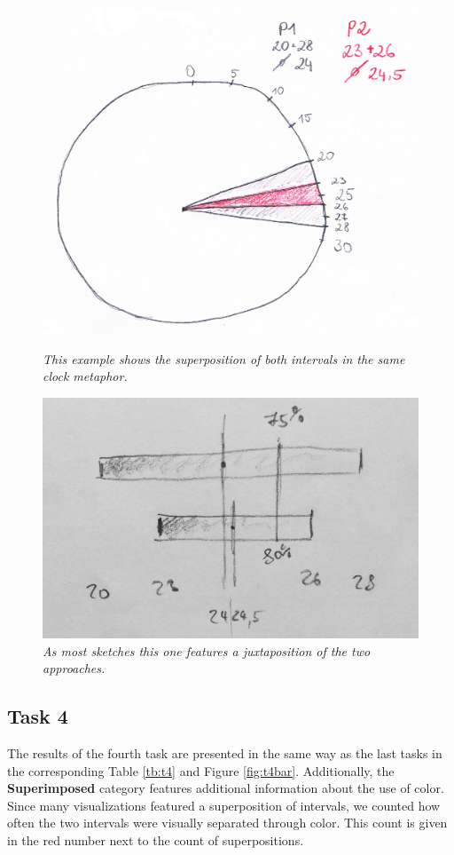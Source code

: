 	\begin{figure}[H]
		\begin{minipage}{.55\textwidth}
			\centering
			\captionsetup{width=0.8\textwidth}
			\includegraphics[height=0.5\textwidth]{figures/superimposed.png}
			\caption{\textit{This example shows the superposition of both intervals in the same clock metaphor.}}
			\label{fig:superimposed}
		\end{minipage}
		\begin{minipage}{.5\textwidth}
			\centering
			\captionsetup{width=1.0\textwidth}
			\includegraphics[height=0.5\textwidth]{figures/juxtaposed.jpg}
			\caption{\textit{As most sketches this one features a juxtaposition of the two approaches.}}
			\label{fig:juxtaposed}
		\end{minipage}
	\end{figure}



\subsection*{Task 4}
The results of the fourth task are presented in the same way as the last tasks in the corresponding Table \ref{tb:t4} and Figure \ref{fig:t4bar}. Additionally, the \textbf{Superimposed} category features additional information about the use of color. Since many visualizations featured a superposition of intervals, we counted how often the two intervals were visually separated through color. This count is given in the red number next to the count of superpositions.


